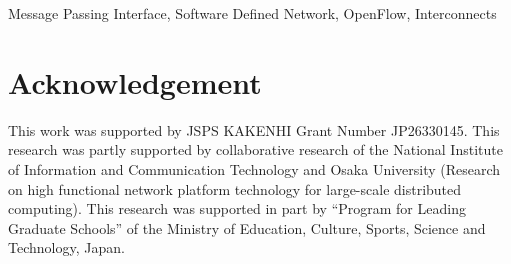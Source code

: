 \documentclass[10pt, a4paper]{IEEEtran}
\begin{document}
\begin{IEEEkeywords}
    Message Passing Interface, Software Defined Network, OpenFlow, Interconnects
\end{IEEEkeywords}








\section*{Acknowledgement}
This work was supported by JSPS KAKENHI Grant Number JP26330145. This research
was partly supported by collaborative research of the National Institute of
Information and Communication Technology and Osaka University (Research on
high functional network platform technology for large-scale distributed
computing). This research was supported in part by ``Program for Leading
Graduate Schools'' of the Ministry of Education, Culture, Sports, Science and
Technology, Japan.

\printbibliography[heading=bibintoc,title={References}]

\par\leavevmode
\end{document}
